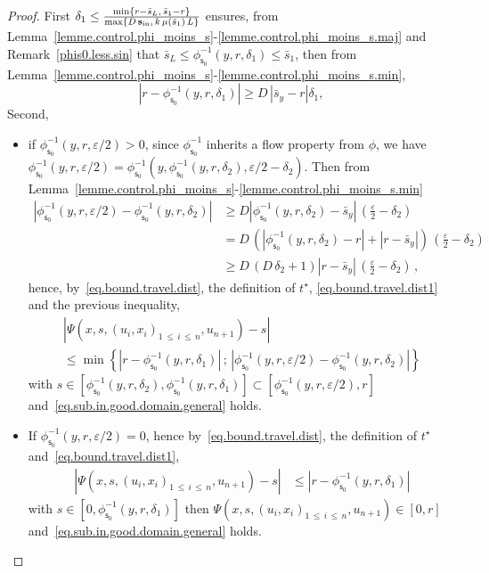 \documentclass[10pt]{amsart}
\theoremstyle{definition}\newtheorem{defi}[theo]{Definition}\newtheorem{rema}[theo]{Remark}\newtheorem{exam}[theo]{Example}\newtheorem{exem}[theo]{Example}\newtheorem{nota}[theo]{Notation}
\newcommand{\Sin}{{\mathbf s}_{\textrm{\tiny\rm in}}}
\newcommand{\barmu}{\mu(\bar s_1)}
\newcommand{\ens}[2]{\left[#1,#2\right]}
\newcommand{\phis}{\phi_{\textsf{s}_0}^{-1}}
\newcommand{\1}{\mathbf{1}}
\begin{document}
\begin{proof}
First $\delta_1\leq \frac{\min\{r-\bar s_L,\, \bar s_1-r\}}{\max\{D\,\Sin,\, k\,\barmu\,L\}}$ ensures, from Lemma~\ref{lemme.control.phi_moins_s}-\ref{lemme.control.phi_moins_s.maj} and Remark~\ref{phis0.less.sin} that $\bar s_L\leq\phis(y,r,\delta_1)\leq\bar s_1$, then from Lemma~\ref{lemme.control.phi_moins_s}-\ref{lemme.control.phi_moins_s.min},
\begin{equation}\label{eq.bound.travel.dist1}
\left|r-\phis(y,r,\delta_1)\right| \geq D\, \left|\bar s_y-r\right|\delta_1,
\end{equation}
Second,
\begin{itemize}
\item if $\phis(y,r, \varepsilon/2)>0$, since $\phis$ inherits a flow property from $\phi$, we have $\phis(y,r, \varepsilon/2) = \phis(y,\phis(y,r, \delta_2), \varepsilon/2-\delta_2)$. Then from Lemma~\ref{lemme.control.phi_moins_s}-\ref{lemme.control.phi_moins_s.min}
\begin{align*}
\left|\phis(y, r, \varepsilon/2) - \phis(y,r, \delta_2)\right| & \geq D\left|\phis(y, r, \delta_2) - \bar s_y\right|\,\left(\frac{\varepsilon}{2}-\delta_2\right)
\\
& = D\,\left(\left|\phis(y,r, \delta_2) - r\right| + |r- \bar s_y|\right)\,\left(\frac{\varepsilon}{2}-\delta_2\right)
\\
& \geq D\,(D\,\delta_2+1)|r- \bar s_y|\,\left(\frac{\varepsilon}{2}-\delta_2\right)\,,
\end{align*}
hence, by~\eqref{eq.bound.travel.dist}, the definition of $t^\star$, \eqref{eq.bound.travel.dist1} and the previous inequality,
\begin{multline*}
\left|\Psi(x,s,(u_i,x_i)_{1\,\leq\,i\,\leq\,n},u_{n+1})-s\right|
\\
\leq \min\left\{\left|r-\phis(y,r,\delta_1)\right|\,;\,\left|\phis(y, r, \varepsilon/2) - \phis(y,r, \delta_2)\right| \right\}
\end{multline*}
with $s\in [\phis(y,r,\delta_2), \phis(y,r,\delta_1)] \subset [\phis(y,r,\varepsilon/2),r]$ and~\eqref{eq.sub.in.good.domain.general} holds.

\item If $\phis(y,r, \varepsilon/2)=0$, hence by~\eqref{eq.bound.travel.dist}, the definition of $t^\star$ and~\eqref{eq.bound.travel.dist1},
\begin{align*}
\left|\Psi(x,s,(u_i,x_i)_{1\,\leq\,i\,\leq\,n},u_{n+1})-s\right| &\leq \left|r-\phis(y,r,\delta_1)\right|
\end{align*}
with $s\in [0,\phis(y,r,\delta_1)]$ then $\Psi(x,s,(u_i,x_i)_{1\,\leq\,i\,\leq\,n},u_{n+1})\in \ens{0}{r}$ and~\eqref{eq.sub.in.good.domain.general} holds.
\end{itemize}



\end{proof}
\end{document}
